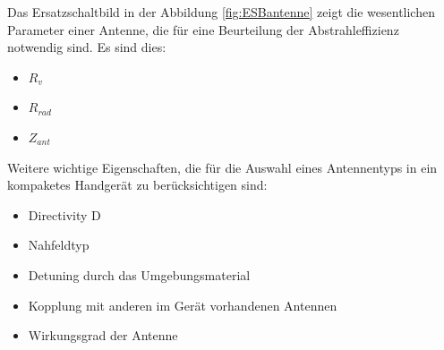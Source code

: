 Das Ersatzschaltbild in der Abbildung \ref{fig:ESBantenne} zeigt die wesentlichen Parameter einer Antenne, die für eine Beurteilung der Abstrahleffizienz notwendig sind. Es sind dies:
\begin{itemize}
\item $R_{v}$
\item $R_{rad}$
\item $Z_{ant}$
\end{itemize}
Weitere wichtige Eigenschaften, die für die Auswahl eines Antennentyps in ein kompaketes Handgerät zu berücksichtigen sind:
\begin{itemize}
\item Directivity D
\item Nahfeldtyp
\item Detuning durch das Umgebungsmaterial
\item Kopplung mit anderen im Gerät vorhandenen Antennen
\item Wirkungsgrad der Antenne
\end{itemize}


